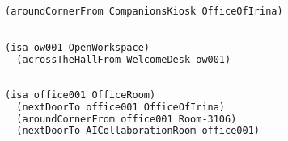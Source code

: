 \documentclass[11pt]{article}
\begin{document}
\subsection{}
\begin{lstlisting}[language=lisp]
  (aroundCornerFrom CompanionsKiosk OfficeOfIrina)
\end{lstlisting}

\subsection{}
\begin{lstlisting}[language=lisp]
  (isa ow001 OpenWorkspace)
  (acrossTheHallFrom WelcomeDesk ow001)
\end{lstlisting}

\subsection{}
\begin{lstlisting}[language=lisp]
  (isa office001 OfficeRoom)
  (nextDoorTo office001 OfficeOfIrina)
  (aroundCornerFrom office001 Room-3106)
  (nextDoorTo AICollaborationRoom office001)
\end{lstlisting}
\end{document}
